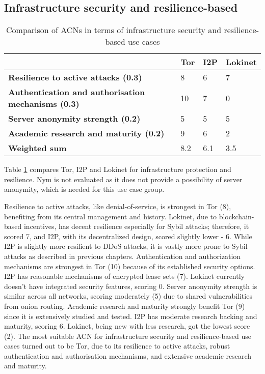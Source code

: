 \subsection{Infrastructure security and resilience-based}

\begin{table}[!ht]
\caption{Comparison of ACNs in terms of infrastructure security and resilience-based use cases}
\label{tab:security_resilience_uc}
\small
\begin{tabular}{|p{}|p{}|p{}|p{}|}
\hline
\textbf{} & \textbf{Tor} & \textbf{I2P} & \textbf{Lokinet} \\
\hline
\textbf{Resilience to active attacks (0.3)} & 8 & 6 & 7 \\
\hline
\textbf{Authentication and authorisation mechanisms (0.3)} & 10 & 7 & 0 \\
\hline
\textbf{Server anonymity strength (0.2)} & 5 & 5 & 5 \\
\hline
\textbf{Academic research and maturity (0.2)} & 9 & 6 & 2 \\
\hline
\textbf{Weighted sum} & 8.2 & 6.1 & 3.5 \\
\hline
\end{tabular}
\end{table}

Table \ref{tab:security_resilience_uc} compares Tor, I2P and Lokinet for infrastructure protection and resilience. Nym is not evaluated as it does not provide a possibility of server anonymity, which is needed for this use case group.

Resilience to active attacks, like denial-of-service, is strongest in Tor (8), benefiting from its central management and history. Lokinet, due to blockchain-based incentives, has decent resilience especially for Sybil attacks; therefore, it scored 7, and I2P, with its decentralized design, scored slightly lower - 6. While I2P is slightly more resilient to DDoS attacks, it is vastly more prone to Sybil attacks as described in previous chapters.
Authentication and authorization mechanisms are strongest in Tor (10) because of its established security options. I2P has reasonable mechanisms of encrypted lease sets (7). Lokinet currently doesn't have integrated security features, scoring 0.
Server anonymity strength is similar across all networks, scoring moderately (5) due to shared vulnerabilities from onion routing.
Academic research and maturity strongly benefit Tor (9) since it is extensively studied and tested. I2P has moderate research backing and maturity, scoring 6. Lokinet, being new with less research, got the lowest score (2).
The most suitable ACN for infrastructure security and resilience-based use cases turned out to be Tor, due to its resilience to active attacks, robust authentication and authorisation mechanisms, and extensive academic research and maturity.
